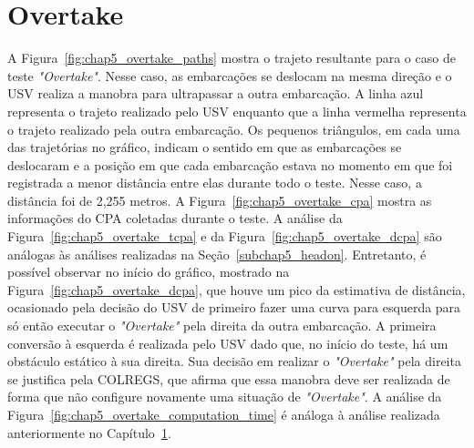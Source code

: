        
    \section{Overtake} \label{subchap5_overtake}
        A Figura~\ref{fig:chap5_overtake_paths} mostra o trajeto resultante para o caso de teste \textit{"Overtake"}. Nesse caso, as embarcações se deslocam na mesma direção e o USV realiza a manobra para ultrapassar a outra embarcação. A linha azul representa o trajeto realizado pelo USV enquanto que a linha vermelha representa o trajeto realizado pela outra embarcação. Os pequenos triângulos, em cada uma das trajetórias no gráfico, indicam o sentido em que as embarcações se deslocaram e a posição em que cada embarcação estava no momento em que foi registrada a menor distância entre elas durante todo o teste. Nesse caso, a distância foi de 2,255 metros. A Figura~\ref{fig:chap5_overtake_cpa} mostra as informações do CPA coletadas durante o teste. A análise da Figura~\ref{fig:chap5_overtake_tcpa} e da Figura~\ref{fig:chap5_overtake_dcpa} são análogas às análises realizadas na Seção~\ref{subchap5_headon}. Entretanto, é possível observar no início do gráfico, mostrado na Figura~\ref{fig:chap5_overtake_dcpa}, que houve um pico da estimativa de 
        distância, ocasionado pela decisão do USV de primeiro fazer uma curva para esquerda para só então executar o \textit{"Overtake"} pela direita da outra embarcação. A primeira conversão à esquerda é realizada pelo USV dado que, no início do teste, há um obstáculo estático à sua direita. Sua decisão em realizar o \textit{"Overtake"} pela direita se justifica pela COLREGS, que afirma que essa manobra deve ser realizada de forma que não configure novamente uma situação de \textit{"Overtake"}. A análise da Figura~\ref{fig:chap5_overtake_computation_time} é análoga à análise realizada anteriormente no Capítulo~\ref{subchap5_overtake}.
       

